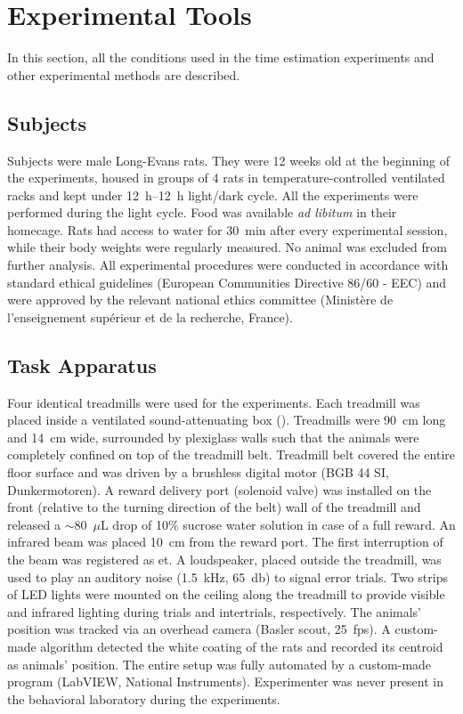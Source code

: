\section{Experimental Tools} \label{ch:methods:exp}
In this section, all the conditions used in the time estimation experiments and other experimental methods are described.

\subsection{Subjects}
Subjects were male Long-Evans rats.
They were 12 weeks old at the beginning of the experiments, housed in groups of 4 rats in temperature-controlled ventilated racks and kept under 12~h--12~h light/dark cycle.
All the experiments were performed during the light cycle.
Food was available \textit{ad libitum} in their homecage.
Rats had access to water for 30~min after every experimental session, while their body weights were regularly measured.
No animal was excluded from further analysis.
All experimental procedures were conducted in accordance with standard ethical guidelines (European Communities Directive 86/60 - EEC) and were approved by the relevant national ethics committee (Minist\`{e}re de l'enseignement sup\'{e}rieur et de la recherche, France).

\subsection{Task Apparatus}
Four identical treadmills were used for the experiments.
Each treadmill was placed inside a ventilated sound-attenuating box ().
Treadmills were 90~cm long and 14~cm wide, surrounded by plexiglass walls such that the animals were completely confined on top of the treadmill belt.
Treadmill belt covered the entire floor surface and was driven by a brushless digital motor (BGB 44 SI, Dunkermotoren).
A reward delivery port (solenoid valve) was installed on the front (relative to the turning direction of the belt) wall of the treadmill and released a $\sim$80~$\mu$L drop of 10\% sucrose water solution in case of a full reward.
An infrared beam was placed 10~cm from the reward port.
The first interruption of the beam was registered as \gls{et}.
A loudspeaker, placed outside the treadmill, was used to play an auditory noise (1.5~kHz, 65~db) to signal error trials.
Two strips of LED lights were mounted on the ceiling along the treadmill to provide visible and infrared lighting during trials and intertrials, respectively.
The animals' position was tracked via an overhead camera (Basler scout, 25~fps).
A custom-made algorithm detected the white coating of the rats and recorded its centroid as animals' position.
The entire setup was fully automated by a custom-made program (LabVIEW, National Instruments).
Experimenter was never present in the behavioral laboratory during the experiments.


